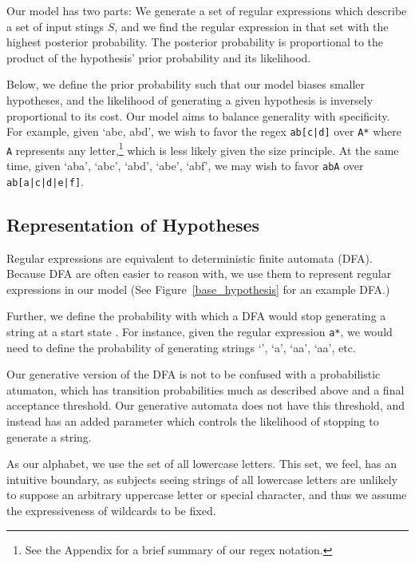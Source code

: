 \documentclass[10pt,letterpaper]{article}
\begin{document}
Our model has two parts: We generate a set of regular expressions which describe a set of input stings $S$, and we find the regular expression in that set with the highest posterior probability. The posterior probability is proportional to the product of the hypothesis' prior probability and its likelihood.

Below, we define the prior probability such that our model biases smaller hypotheses, and the likelihood of generating a given hypothesis is inversely proportional to its cost. Our model aims to balance generality with specificity. For example, given `abc, abd', we wish to favor the regex \verb!ab[c|d]! over \verb!A*! where \verb!A! represents any letter,\footnote{See the Appendix for a brief summary of our regex notation.} which is less likely given the size principle. At the same time, given `aba', `abc', `abd', `abe', `abf', we may wish to favor \verb!abA! over \verb!ab[a|c|d|e|f]!.

\subsection{Representation of Hypotheses}

Regular expressions are equivalent to deterministic finite automata (DFA). Because DFA are often easier to reason with, we use them to represent regular expressions in our model (See Figure~\ref{base_hypothesis} for an example DFA.)

Further, we define the probability with which a DFA would stop generating a string at a start state . For instance, given the regular expression \verb!a*!, we would need to define the probability of generating strings `', `a', `aa', `aa', etc.

Our generative version of the DFA is not to be confused with a probabilistic atumaton, which has transition probabilities much as described above and a final acceptance threshold. Our generative automata does not have this threshold, and instead has an added parameter which controls the likelihood of stopping to generate a string.

As our alphabet, we use the set of all lowercase letters. This set, we feel, has an intuitive boundary, as subjects seeing strings of all lowercase letters are unlikely to suppose an arbitrary uppercase letter or special character, and thus we assume the expressiveness of wildcards to be fixed.

\end{document}
